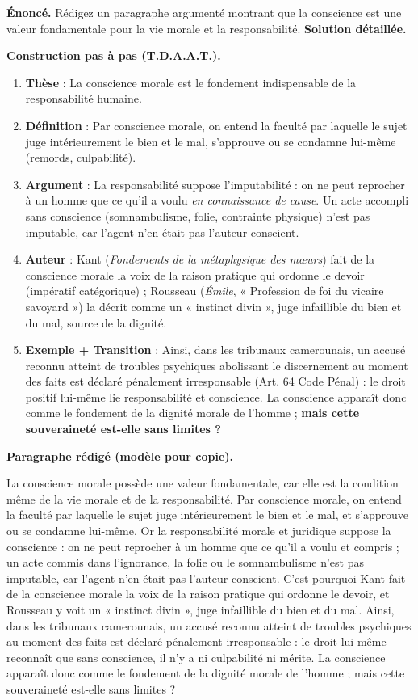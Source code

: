 \documentclass[11pt]{article}
\newcommand{\cle}[1]{{\popxbold\color{popdark}#1}}
\begin{document}
\begin{exoresolu}
\textbf{Énoncé.} Rédigez un paragraphe argumenté montrant que la conscience est une valeur fondamentale pour la vie morale et la responsabilité.
\tcblower
\textbf{Solution détaillée.}

\textbf{Construction pas à pas (T.D.A.A.T.).}
\begin{enumerate}
\item \textbf{Thèse} : La conscience morale est le fondement indispensable de la responsabilité humaine.
\item \textbf{Définition} : Par \cle{conscience morale}, on entend la faculté par laquelle le sujet juge intérieurement le bien et le mal, s'approuve ou se condamne lui-même (remords, culpabilité).
\item \textbf{Argument} : La responsabilité suppose l'imputabilité : on ne peut reprocher à un homme que ce qu'il a voulu \emph{en connaissance de cause}. Un acte accompli sans conscience (somnambulisme, folie, contrainte physique) n'est pas imputable, car l'agent n'en était pas l'auteur conscient.
\item \textbf{Auteur} : Kant (\emph{Fondements de la métaphysique des mœurs}) fait de la conscience morale la voix de la \cle{raison pratique} qui ordonne le devoir (impératif catégorique) ; Rousseau (\emph{Émile}, « Profession de foi du vicaire savoyard ») la décrit comme un « \cle{instinct divin} », juge infaillible du bien et du mal, source de la dignité.
\item \textbf{Exemple + Transition} : Ainsi, dans les tribunaux camerounais, un accusé reconnu atteint de troubles psychiques abolissant le discernement au moment des faits est déclaré \cle{pénalement irresponsable} (Art. 64 Code Pénal) : le droit positif lui-même lie responsabilité et conscience. La conscience apparaît donc comme le fondement de la dignité morale de l'homme ; \textbf{mais cette souveraineté est-elle sans limites ?}
\end{enumerate}

\textbf{Paragraphe rédigé (modèle pour copie).}

La conscience morale possède une valeur fondamentale, car elle est la condition même de la vie morale et de la responsabilité. Par \cle{conscience morale}, on entend la faculté par laquelle le sujet juge intérieurement le bien et le mal, et s'approuve ou se condamne lui-même. Or la responsabilité morale et juridique suppose la conscience : on ne peut reprocher à un homme que ce qu'il a voulu et compris ; un acte commis dans l'ignorance, la folie ou le somnambulisme n'est pas imputable, car l'agent n'en était pas l'auteur conscient. C'est pourquoi Kant fait de la conscience morale la voix de la raison pratique qui ordonne le devoir, et Rousseau y voit un « instinct divin », juge infaillible du bien et du mal. Ainsi, dans les tribunaux camerounais, un accusé reconnu atteint de troubles psychiques au moment des faits est déclaré pénalement irresponsable : le droit lui-même reconnaît que sans conscience, il n'y a ni culpabilité ni mérite. La conscience apparaît donc comme le fondement de la dignité morale de l'homme ; mais cette souveraineté est-elle sans limites ?


\end{exoresolu}
\end{document}
